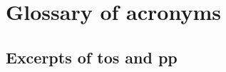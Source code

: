 \documentclass[showtrims]{kthesis}
\newcommand*\VerBar[1]{%
	\begin{tikzpicture}
	\fill[#1] (0,0)--(1,0)--(1,1)--(0,1)--cycle;
	\draw[white] (0.5,0.5)node{\rotatebox{-90}{\Huge \textbf \thechapter}};
	\end{tikzpicture}
}
\newcounter{DogearHShift}
\newcommand{\dogear}[1]{%
  \backgroundsetup{position={current page.north east},vshift=0.5cm,%
    hshift=-\theDogearHShift cm,contents={\VerBar{#1}}}%
  \BgThispage%
  \addtocounter{DogearHShift}{1}
}
\newcommand{\dogearRGB}[1]{%
  \definecolor{dogearColor}{RGB}{#1}%
  \dogear{dogearColor}%
}
\begin{document}
\chapter{Glossary of acronyms}
\printacronyms

\begin{appendices}
    \addappheadtotoc
    \chapter{Excerpts of \ac{tos} and \ac{pp}}
    \section{\Facebook}
    \section{\LinkedIn}
    \section{\Twitter}
\end{appendices}





\end{document}

